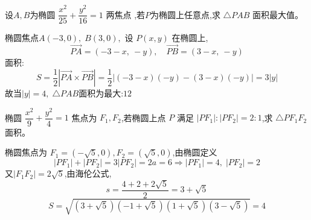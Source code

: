 \begin{questions}
    \question 设\(A,B\)为椭圆 \(\dfrac{x^{2}}{25}+\dfrac{y^{2}}{16}=1\) 两焦点 ,若$P$为椭圆上任意点,求 \(\triangle PAB\) 面积最大值。  
    \begin{solution}
        椭圆焦点$A(-3,0),\;B(3,0),$
        设 $P(x,y)$ 在椭圆上,  
        \[
        \overrightarrow{PA} = (-3 - x,\ -y),\quad \overrightarrow{PB} = (3 - x,\ -y)
        \]
        面积:
        \[
        S = \frac{1}{2} \left| \overrightarrow{PA} \times \overrightarrow{PB} \right| 
        = \frac{1}{2} |(-3 - x)(-y) - (3 - x)(-y)| = 3|y|
        \]
        故当$|y| = 4,\;\triangle PAB$面积为最大:$12$
    \end{solution}

    \question 椭圆 \(\dfrac{x^{2}}{9}+\dfrac{y^{2}}{4}=1\) 焦点为 \(F_1,F_2\),若椭圆上点 \(P\) 满足 \(|PF_1|:|PF_2|=2:1\),求 \(\triangle PF_1F_2\) 面积。 
    \begin{solution}
        椭圆焦点为 \(F_1 = (-\sqrt{5}, 0), F_2 = (\sqrt{5}, 0)\),由椭圆定义
        \[
        |PF_1| + |PF_2| = 3|PF_2| = 2a = 6 \Rightarrow |PF_1| = 4,\; |PF_2| = 2
        \]
        又$|F_1F_2|=2\sqrt5$,由海伦公式,
        \[
        s = \frac{4 + 2 + 2\sqrt{5}}{2} = 3 + \sqrt{5}
        \]
        \[
        S = \sqrt{ (3+\sqrt{5})(-1+\sqrt{5})(1+\sqrt{5})(3-\sqrt{5})} = 4
        \]
    \end{solution}


\end{questions}
